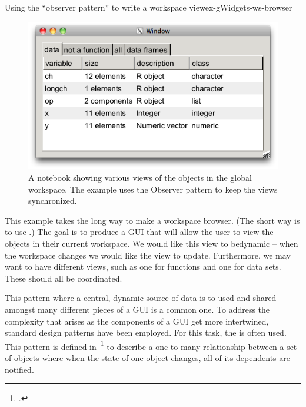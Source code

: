 \begin{example}{Using the ``observer pattern'' to write a workspace view}{ex-gWidgets-ws-browser}
\begin{figure}
  \centering
  \includegraphics[width=.6\textwidth]{fig-gWidgets-ws-browser.png}
  \caption{A notebook showing various views of the objects in the global workspace. The example uses the Observer pattern to keep the views synchronized.}
  \label{fig:gWidgets-ws-browser}
\end{figure}
This example takes the long way to make a workspace browser. (The
short way is to use .) The goal is to produce
a GUI that will allow the user to view the objects in their current
workspace. We would like this view to bedynamic -- when the workspace
changes we would like the view to update. Furthermore, we may want to
have different views, such as one for functions and one for data
sets. These should all be coordinated.


This pattern where a central, dynamic source of data is to used and
shared amongst many different pieces of a GUI is a common one. To
address the complexity that arises as the components of a GUI get more
intertwined, standard design patterns have been employed. For this
task, the  is often used. This pattern is
defined in~\footcite{head-first-design-patterns} to describe a
one-to-many relationship between a set of objects where when the state
of one object changes, all of its dependents are notified.





\end{example}

